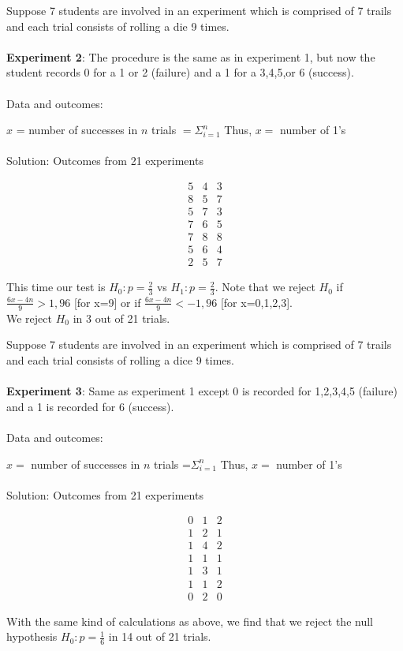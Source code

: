 \documentclass[12pt,a4paper]{article}
\theoremstyle{regla}
\theoremstyle{remark}
\theoremstyle{definition}
\theoremstyle{nonumberbreak}
\begin{document}
\begin{xmpl}
Suppose 7 students are involved in an experiment which is comprised of 7 trails and each trial consists of rolling a die 9 times.\\
\\

\textbf{Experiment 2}: The procedure is the same as in experiment 1,  but now the student records 0 for a 1 or 2 (failure) and a 1 for a 3,4,5,or 6 (success). \\\\

Data and outcomes: 

$x$ = number of successes in $n$ trials $=\Sigma_{i=1}^n$ 
Thus, $x =$ number of 1's\\\\

Solution:
Outcomes from 21 experiments


$$\begin{matrix}
5 & 4 & 3\\
8 & 5 & 7\\
5 & 7 & 3\\ 
7 & 6 & 5\\ 
7 & 8 & 8\\ 
5 & 6 & 4\\ 
2 & 5 & 7
\end{matrix}$$

This time our test is $H_0:p=\frac{2}{3}$ vs $H_1:p=\frac{2}{3}$. Note that we reject $H_0$ if $\frac{6x-4n}{9}>1,96$ [for x=9] or if $\frac{6x-4n}{9}<-1,96$ [for x=0,1,2,3]. \\

We reject $H_0$ in 3 out of 21 trials.
\end{xmpl}
\begin{xmpl}
Suppose 7 students are involved in an experiment which is comprised of 7 trails and each trial consists of rolling a dice 9 times.\\
\\

\textbf{Experiment 3}: Same as experiment 1 except 0 is recorded for 1,2,3,4,5 (failure) and a 1 is recorded for 6 (success). \\
\\
Data and outcomes: 

$x =$ number of successes in $n$ trials =$\Sigma_{i=1}^n$ 
Thus, $x =$ number of 1's \\\\

Solution:
Outcomes from 21 experiments

$$\begin{matrix}
0 & 1 & 2\\
1 & 2 & 1\\
1 & 4 & 2\\ 
1 & 1 & 1\\
1 & 3 & 1\\ 
1 & 1 & 2\\ 
0 & 2 & 0
\end{matrix}$$

With the same kind of calculations as above, we find that we reject the null hypothesis $H_0:p=\frac{1}{6}$ in 14 out of 21 trials. 
\end{xmpl}
\end{document}
